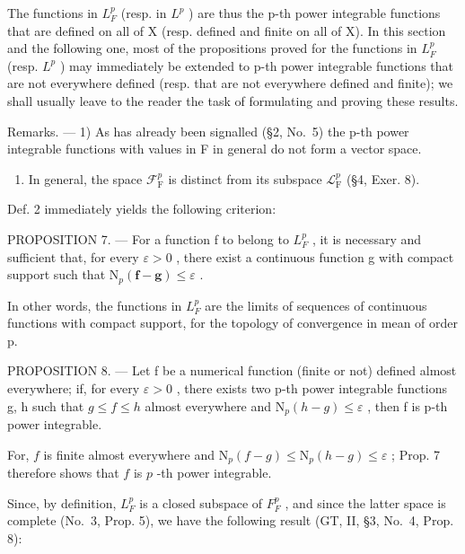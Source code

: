The functions in \(L_{F}^{p}\) (resp. in \(L^{p}\) ) are thus the p-th power integrable functions that are defined on all of X (resp. defined and finite on all of X). In this section and the following one, most of the propositions proved for the functions in \(L_{F}^{p}\) (resp. \(L^{p}\) ) may immediately be extended to p-th power integrable functions that are not everywhere defined (resp. that are not everywhere defined and finite); we shall usually leave to the reader the task of formulating and proving these results.

Remarks. --- 1) As has already been signalled (§2, No.~5) the p-th power integrable functions with values in F in general do not form a vector space.

\begin{enumerate}
\def\labelenumi{\arabic{enumi})}
\setcounter{enumi}{1}
\tightlist
\item
  In general, the space \(\mathcal{F}_{\mathrm{F}}^{p}\) is distinct from its subspace \(\mathcal{L}_{\mathrm{F}}^{p}\) (§4, Exer. 8).
\end{enumerate}

Def. 2 immediately yields the following criterion:

PROPOSITION 7. --- For a function f to belong to \(L_{F}^{p}\) , it is necessary and sufficient that, for every \(\varepsilon > 0\) , there exist a continuous function g with compact support such that \(\mathrm{N}_{p}(\mathbf{f} - \mathbf{g}) \leqslant \varepsilon\) .

In other words, the functions in \(L_{F}^{p}\) are the limits of sequences of continuous functions with compact support, for the topology of convergence in mean of order p.

PROPOSITION 8. --- Let f be a numerical function (finite or not) defined almost everywhere; if, for every \(\varepsilon > 0\) , there exists two p-th power integrable functions g, h such that \(g \leqslant f \leqslant h\) almost everywhere and \(\mathrm{N}_{p}(h - g) \leqslant \varepsilon\) , then f is p-th power integrable.

For, \(f\) is finite almost everywhere and \(\mathrm{N}_p(f - g) \leqslant \mathrm{N}_p(h - g) \leqslant \varepsilon\) ; Prop. 7 therefore shows that \(f\) is \(p\) -th power integrable.

Since, by definition, \(L_{F}^{p}\) is a closed subspace of \(F_{F}^{p}\) , and since the latter space is complete (No.~3, Prop. 5), we have the following result (GT, II, §3, No.~4, Prop. 8):

